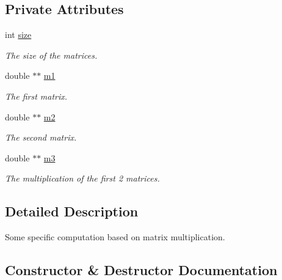 \subsection*{Private Attributes}
\begin{DoxyCompactItemize}
\item 
int \hyperlink{classMatrix__computation__no__eigen_a1f73cf9e7670c6a78a64cb8977f2dcc6}{size}
\begin{DoxyCompactList}\small\item\em The size of the matrices. \end{DoxyCompactList}\item 
double $\ast$$\ast$ \hyperlink{classMatrix__computation__no__eigen_a66d9dde3f7fc191c8be8b23a1c7764e2}{m1}
\begin{DoxyCompactList}\small\item\em The first matrix. \end{DoxyCompactList}\item 
double $\ast$$\ast$ \hyperlink{classMatrix__computation__no__eigen_a4cda5f8f06be2a85621b1ce1eca7cded}{m2}
\begin{DoxyCompactList}\small\item\em The second matrix. \end{DoxyCompactList}\item 
double $\ast$$\ast$ \hyperlink{classMatrix__computation__no__eigen_a54b2738e77b3282368ac2c7fd184d2a3}{m3}
\begin{DoxyCompactList}\small\item\em The multiplication of the first 2 matrices. \end{DoxyCompactList}\end{DoxyCompactItemize}


\subsection{Detailed Description}
Some specific computation based on matrix multiplication. 

\subsection{Constructor \& Destructor Documentation}
\mbox{\label{classMatrix__computation__no__eigen_af70d9fcfdc0c9a9b755a9261211dce8a}} 
